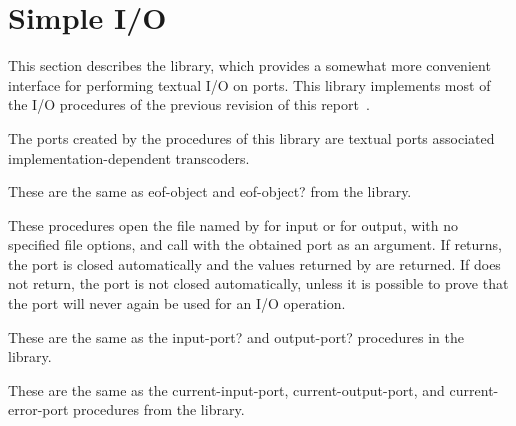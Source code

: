 \section{Simple I/O}
\label{simpleiosection}

This section describes the  library, which
provides a somewhat more convenient interface for performing textual
I/O on ports.  This library implements most of the 
I/O procedures of the previous revision of this report~\cite{R5RS}.

The ports created by the procedures of this library are textual ports
associated implementation-dependent transcoders.

\begin{entry}{%
}

These are the same as {\cf eof-object} and {\cf eof-object?} from the
 library.
\end{entry}

\begin{entry}{%
}

These procedures open the file named by  for input or
for output, with no specified file options, and call  with
the obtained port as an argument.  If  returns, the
port is closed automatically and the values returned by  are
returned. If  does not return, the port is not
closed automatically, unless it is possible to prove that the port
will never again be used for an I/O operation.
\end{entry}

\begin{entry}{%
}

These are the same as the {\cf input-port?} and {\cf output-port?}
procedures in the  library.
\end{entry}

\begin{entry}{%
}
 
These are the same as the {\cf current-input-port}, {\cf
  current-output-port}, and {\cf current-error-port} procedures from
the  library.
\end{entry}

